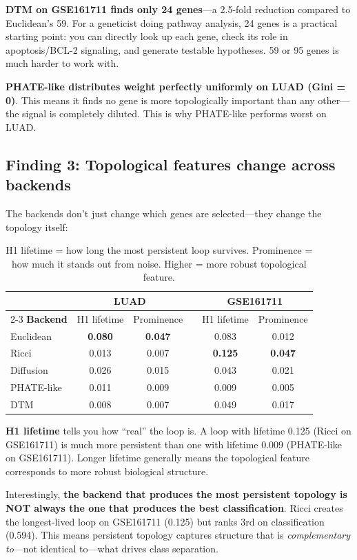 \documentclass[11pt]{article}
\begin{document}
\begin{takeaway}
\textbf{DTM on GSE161711 finds only 24 genes}---a 2.5-fold reduction compared to Euclidean's 59. For a geneticist doing pathway analysis, 24 genes is a practical starting point: you can directly look up each gene, check its role in apoptosis/BCL-2 signaling, and generate testable hypotheses. 59 or 95 genes is much harder to work with.

\textbf{PHATE-like distributes weight perfectly uniformly on LUAD (Gini = 0)}. This means it finds no gene is more topologically important than any other---the signal is completely diluted. This is why PHATE-like performs worst on LUAD.
\end{takeaway}

\subsection{Finding 3: Topological features change across backends}

The backends don't just change which genes are selected---they change the topology itself:

\begin{table}[h]
\centering
\begin{tabular}{lcclcc}
\toprule
& \multicolumn{2}{c}{\textbf{LUAD}} & & \multicolumn{2}{c}{\textbf{GSE161711}} \\
\cmidrule{2-3} \cmidrule{5-6}
\textbf{Backend} & H1 lifetime & Prominence & & H1 lifetime & Prominence \\
\midrule
Euclidean & \textbf{0.080} & \textbf{0.047} & & 0.083 & 0.012 \\
Ricci & 0.013 & 0.007 & & \textbf{0.125} & \textbf{0.047} \\
Diffusion & 0.026 & 0.015 & & 0.043 & 0.021 \\
PHATE-like & 0.011 & 0.009 & & 0.009 & 0.005 \\
DTM & 0.008 & 0.007 & & 0.049 & 0.017 \\
\bottomrule
\end{tabular}
\caption{H1 lifetime = how long the most persistent loop survives. Prominence = how much it stands out from noise. Higher = more robust topological feature.}
\end{table}

\begin{keyconcept}
\textbf{H1 lifetime} tells you how ``real'' the loop is. A loop with lifetime 0.125 (Ricci on GSE161711) is much more persistent than one with lifetime 0.009 (PHATE-like on GSE161711). Longer lifetime generally means the topological feature corresponds to more robust biological structure.

Interestingly, \textbf{the backend that produces the most persistent topology is NOT always the one that produces the best classification}. Ricci creates the longest-lived loop on GSE161711 (0.125) but ranks 3rd on classification (0.594). This means persistent topology captures structure that is \emph{complementary to}---not identical to---what drives class separation.
\end{keyconcept}
\end{document}
